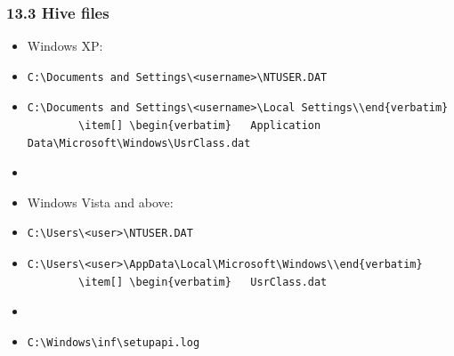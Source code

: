 \begin{frame}[fragile]
  \frametitle{13.3 Hive files}
    \begin{itemize}
        \item Windows XP:
        \item[] \begin{verbatim}C:\Documents and Settings\<username>\NTUSER.DAT\end{verbatim}
        \item[] \begin{verbatim}C:\Documents and Settings\<username>\Local Settings\\end{verbatim}
        \item[] \begin{verbatim}   Application Data\Microsoft\Windows\UsrClass.dat\end{verbatim}
        \item[]
        \item Windows Vista and above:
        \item[] \begin{verbatim}C:\Users\<user>\NTUSER.DAT\end{verbatim}
        \item[] \begin{verbatim}C:\Users\<user>\AppData\Local\Microsoft\Windows\\end{verbatim}
        \item[] \begin{verbatim}   UsrClass.dat\end{verbatim}
        \item[]
        \item \begin{verbatim}C:\Windows\inf\setupapi.log\end{verbatim}
    \end{itemize}
\end{frame}


